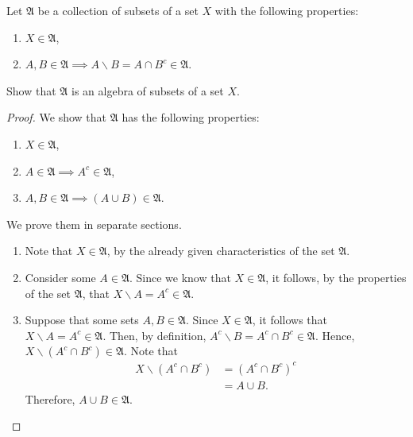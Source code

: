 \documentclass[12pt]{article}
\newenvironment{problem}[2][Problem]{\begin{trivlist}
		\item[\hskip \labelsep {\bfseries #1}\hskip \labelsep {\bfseries #2.}]}{\end{trivlist}}
\begin{document}
\begin{problem}{1.8}
	Let $\mathfrak{A}$ be a collection of subsets of a set $X$ with the following properties:
	\begin{enumerate}
		\item $X\in \mathfrak{A}$,
		\item $A,B \in \mathfrak{A} \implies A\backslash B = A\cap B^{c} \in \mathfrak{A}$.
	\end{enumerate}
	Show that $\mathfrak{A}$ is an algebra of subsets of a set $X$.
	\begin{proof}
		We show that $\mathfrak{A}$ has the following properties:
		\begin{enumerate}
			\item $X\in \mathfrak{A}$,
			\item $A \in \mathfrak{A} \implies A^{c} \in \mathfrak{A}$,
			\item $A,B \in \mathfrak{A} \implies (A\cup B)\in \mathfrak{A}$.
		\end{enumerate}
		We prove them in separate sections.
		\begin{enumerate}
		\item Note that $X\in \mathfrak{A}$, by the already given characteristics of the set $\mathfrak{A}$. 
		
		\item Consider some $A\in \mathfrak{A}$. Since we know that $X\in \mathfrak{A}$, it follows, by the properties of the set $\mathfrak{A}$, that $X\backslash A = A^{c} \in \mathfrak{A}$.  
		
		\item Suppose that some sets $A,B\in \mathfrak{A}$. Since $X\in \mathfrak{A}$, it follows that $X\backslash A = A^{c} \in \mathfrak{A}$. Then, by definition, $A^{c}\backslash B = A^{c} \cap B^{c} \in \mathfrak{A}$. Hence, $X\backslash \left(A^{c} \cap B^{c}\right) \in \mathfrak{A}$. Note that
		\begin{align*}
			X\backslash \left(A^{c} \cap B^{c}\right) &= \left(A^{c} \cap B^{c}\right)^{c}\\
			&= A\cup B.
		\end{align*}
	Therefore, $A\cup B \in \mathfrak{A}$.
		\end{enumerate}
	\end{proof}
\end{problem}
\end{document}
